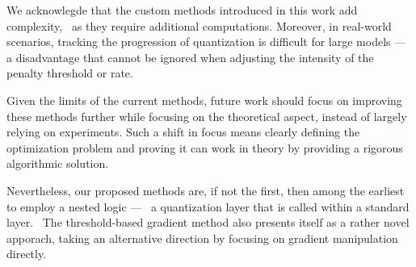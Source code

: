 We acknowlegde that the custom methods introduced in this work add complexity, \
as they require additional computations. 
Moreover, in real-world scenarios, tracking the progression of quantization is difficult for large models — a disadvantage that cannot be ignored when adjusting the intensity of the penalty threshold or rate. \

Given the limits of the current methods, 
future work should focus on improving these methods further while focusing on the theoretical aspect, 
instead of largely relying on experiments. 
Such a shift in focus means clearly defining the optimization problem and proving it can work in theory
by providing a rigorous algorithmic solution.

Nevertheless, our proposed methods are, if not the first, then among the earliest to employ a nested logic — \
a quantization layer that is called within a standard layer. \
The threshold-based gradient method also presents itself as a rather novel apporach, 
taking an alternative direction by focusing on gradient manipulation directly.